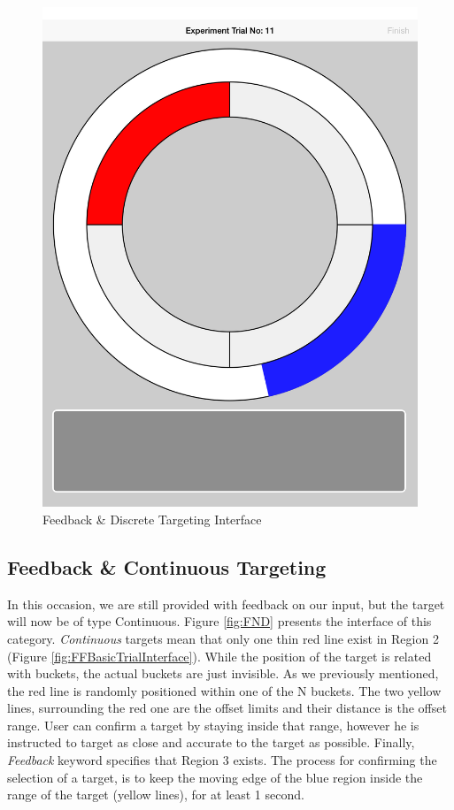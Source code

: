 \begin{figure}[H]
\centering
\includegraphics[scale=0.07]{figures/FD.png}
\caption{Feedback \& Discrete Targeting Interface}
\label{fig:FD}
\end{figure}



\subsection{Feedback \& Continuous Targeting}

In this occasion, we are still provided with feedback on our input, but the target will now be of type Continuous. Figure \ref{fig:FND} presents the interface of this category. \emph{Continuous} targets mean that only one thin red line exist in Region 2 (Figure \ref{fig:FFBasicTrialInterface}). While the position of the target is related with buckets, the actual buckets are just invisible. As we previously mentioned, the red line is randomly positioned within one of the N buckets. The two yellow lines, surrounding the red one are the offset limits and their distance is the offset range.  User can confirm a target by staying inside that range, however he is instructed to target as close and accurate to the target as possible. Finally, \emph{Feedback} keyword specifies that Region 3 exists. The process for confirming the selection of a target, is to keep the moving edge of the blue region inside the range of the target (yellow lines), for at least 1 second.

